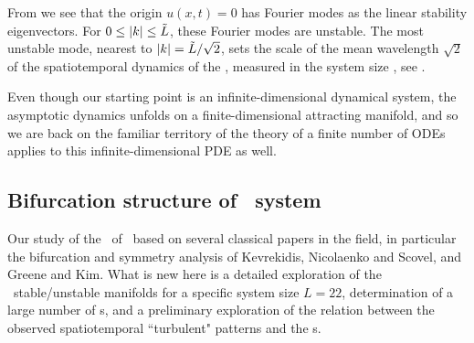 From  we see that the origin $u(x,t) = 0$
has Fourier modes as the  linear
stability eigenvectors.
For $0 \leq |k| \leq \tilde{L}$, these Fourier modes are
unstable.
The most unstable mode, nearest to $|k|=\tilde{L}/\sqrt{2}$,
sets the scale of the mean wavelength $\sqrt{2}$
of the spatiotemporal dynamics of the {\KSe},
measured in the system size \tildeL, see .


%
%

Even though our starting point
is an infinite-dimensional dynamical system, the asymptotic dynamics
unfolds on a finite-dimensional attracting manifold, and so we are back on
the familiar territory of
the theory of a finite number of ODEs applies to this
infinite-dimensional PDE as well.

\subsection{Bifurcation structure of \KS\ system}
\label{sec:KSlit}
%

Our study of the \eqva\ of
\KSe\ based on several classical papers in the field,
in particular the bifurcation and symmetry analysis of
Kevrekidis, Nicolaenko and Scovel,
and
Greene and Kim. What is new here is
a detailed exploration of the \eqva\ stable/unstable manifolds
for a specific system size $L = 22$, determination
of a large number of \rpo s, and a preliminary
exploration of the relation between the
observed spatiotemporal ``turbulent" patterns and
the \rpo s.


